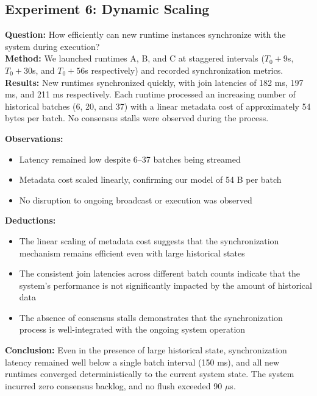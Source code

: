 \documentclass[10pt]{IEEEtran}
\begin{document}
\subsection{Experiment 6: Dynamic Scaling}
\textbf{Question:} How efficiently can new runtime instances synchronize with the system during execution? \\
\textbf{Method:} We launched runtimes A, B, and C at staggered intervals ($T_0 + 9$s, $T_0 + 30$s, and $T_0 + 56$s respectively) and recorded synchronization metrics. \\
\textbf{Results:} New runtimes synchronized quickly, with join latencies of 182 ms, 197 ms, and 211 ms respectively. Each runtime processed an increasing number of historical batches (6, 20, and 37) with a linear metadata cost of approximately 54 bytes per batch. No consensus stalls were observed during the process.

\textbf{Observations:}
\begin{itemize}
    \item Latency remained low despite 6–37 batches being streamed
    \item Metadata cost scaled linearly, confirming our model of 54 B per batch
    \item No disruption to ongoing broadcast or execution was observed
\end{itemize}
\textbf{Deductions:}
\begin{itemize}
    \item The linear scaling of metadata cost suggests that the synchronization mechanism remains efficient even with large historical states
    \item The consistent join latencies across different batch counts indicate that the system's performance is not significantly impacted by the amount of historical data
    \item The absence of consensus stalls demonstrates that the synchronization process is well-integrated with the ongoing system operation
\end{itemize}
\textbf{Conclusion:} Even in the presence of large historical state, synchronization latency remained well below a single batch interval (150 ms), and all new runtimes converged deterministically to the current system state. The system incurred zero consensus backlog, and no flush exceeded 90 $\mu$s.
\end{document}
